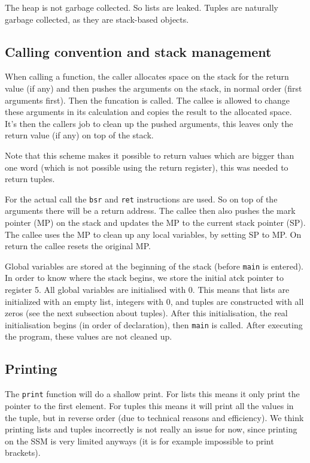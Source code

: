 \documentclass[14pt]{amsart}
\begin{document}
The heap is not garbage collected. So lists are leaked. Tuples are naturally garbage collected, as they are stack-based objects.

\subsection{Calling convention and stack management}
When calling a function, the caller allocates space on the stack for the return value (if any) and then pushes the arguments on the stack, in normal order (first arguments first). Then the funcation is called. The callee is allowed to change these arguments in its calculation and copies the result to the allocated space. It's then the callers job to clean up the pushed arguments, this leaves only the return value (if any) on top of the stack.

Note that this scheme makes it possible to return values which are bigger than one word (which is not possible using the return register), this was needed to return tuples.

For the actual call the \texttt{bsr} and \texttt{ret} instructions are used. So on top of the arguments there will be a return address. The callee then also pushes the mark pointer (MP) on the stack and updates the MP to the current stack pointer (SP). The callee uses the MP to clean up any local variables, by setting SP to MP. On return the callee resets the original MP.

Global variables are stored at the beginning of the stack (before \texttt{main} is entered). In order to know where the stack begins, we store the initial atck pointer to register 5. All global variables are initialised with 0. This means that lists are initialized with an empty list, integers with 0, and tuples are constructed with all zeros (see the next subsection about tuples). After this initialisation, the real initialisation begins (in order of declaration), then \texttt{main} is called. After executing the program, these values are not cleaned up.

\subsection{Printing}
The \texttt{print} function will do a shallow print. For lists this means it only print the pointer to the first element. For tuples this means it will print all the values in the tuple, but in reverse order (due to technical reasons and efficiency). We think printing lists and tuples incorrectly is not really an issue for now, since printing on the SSM is very limited anyways (it is for example impossible to print brackets).
\end{document}
